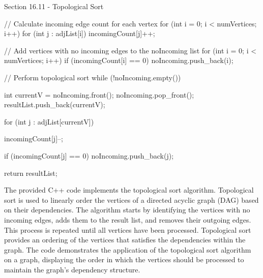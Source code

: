 \begin{notes}{Section 16.11 - Topological Sort}
\begin{highlight}
\begin{code}[C++]
{        // Calculate incoming edge count for each vertex
        for (int i = 0; i < numVertices; i++) {
            for (int j : adjList[i]) {
                incomingCount[j]++;
            }
        }
    
        // Add vertices with no incoming edges to the noIncoming list
        for (int i = 0; i < numVertices; i++) {
            if (incomingCount[i] == 0) {
                noIncoming.push_back(i);
            }
        }
    
        // Perform topological sort
        while (!noIncoming.empty()) {
            int currentV = noIncoming.front();
            noIncoming.pop_front();
            resultList.push_back(currentV);
    
            for (int j : adjList[currentV]) {
                incomingCount[j]--;
    
                if (incomingCount[j] == 0) {
                    noIncoming.push_back(j);
                }
            }
        }
    
        return resultList;
    }
    \end{code}
        The provided C++ code implements the topological sort algorithm. Topological sort is used to linearly order the vertices of a directed acyclic graph (DAG) based on their dependencies. The algorithm starts by identifying the 
        vertices with no incoming edges, adds them to the result list, and removes their outgoing edges. This process is repeated until all vertices have been processed. Topological sort provides an ordering of the vertices that satisfies 
        the dependencies within the graph. The code demonstrates the application of the topological sort algorithm on a graph, displaying the order in which the vertices should be processed to maintain the graph's dependency structure.
    \end{highlight}
\end{notes}

